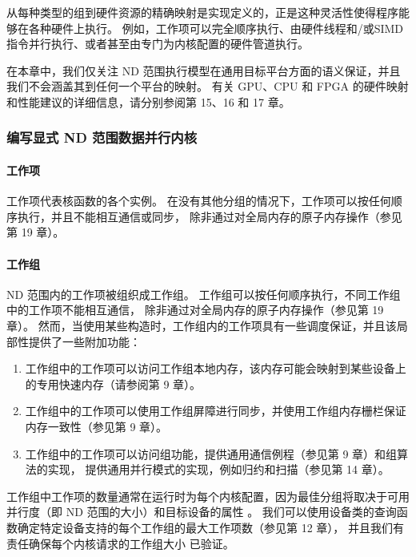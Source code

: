 从每种类型的组到硬件资源的精确映射是实现定义的，正是这种灵活性使得程序能够在各种硬件上执行。 
例如，工作项可以完全顺序执行、由硬件线程和/或SIMD指令并行执行、或者甚至由专门为内核配置的硬件管道执行。

在本章中，我们仅关注 ND 范围执行模型在通用目标平台方面的语义保证，并且我们不会涵盖其到任何一个平台的映射。 
有关 GPU、CPU 和 FPGA 的硬件映射和性能建议的详细信息，请分别参阅第 15、16 和 17 章。

\subsubsection{编写显式 ND 范围数据并行内核}
\paragraph{工作项}

工作项代表核函数的各个实例。 
在没有其他分组的情况下，工作项可以按任何顺序执行，并且不能相互通信或同步，
除非通过对全局内存的原子内存操作（参见第 19 章）。

\paragraph{工作组}

ND 范围内的工作项被组织成工作组。 工作组可以按任何顺序执行，不同工作组中的工作项不能相互通信，
除非通过对全局内存的原子内存操作（参见第 19 章）。 
然而，当使用某些构造时，工作组内的工作项具有一些调度保证，并且该局部性提供了一些附加功能：

\begin{enumerate}
	\item 工作组中的工作项可以访问工作组本地内存，该内存可能会映射到某些设备上的专用快速内存（请参阅第 9 章）。

	\item 工作组中的工作项可以使用工作组屏障进行同步，并使用工作组内存栅栏保证内存一致性（参见第 9 章）。

	\item 工作组中的工作项可以访问组功能，提供通用通信例程（参见第 9 章）和组算法的实现，
	提供通用并行模式的实现，例如归约和扫描（参见第 14 章）。
\end{enumerate}

工作组中工作项的数量通常在运行时为每个内核配置，因为最佳分组将取决于可用并行度（即 ND 范围的大小）和目标设备的属性 。 
我们可以使用设备类的查询函数确定特定设备支持的每个工作组的最大工作项数（参见第 12 章），
并且我们有责任确保每个内核请求的工作组大小 已验证。


